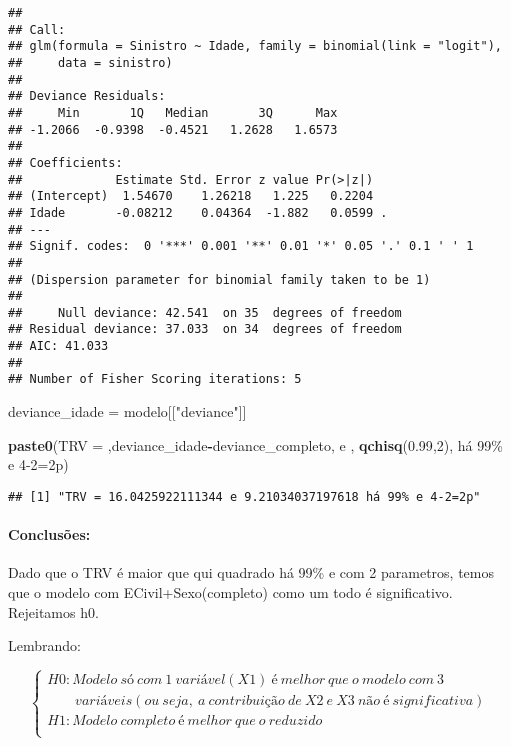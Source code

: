 \documentclass[
]{article}
\newenvironment{Shaded}{\begin{snugshade}}{\end{snugshade}}
\newcommand{\DecValTok}[1]{\textcolor[rgb]{0.00,0.00,0.81}{#1}}
\newcommand{\FloatTok}[1]{\textcolor[rgb]{0.00,0.00,0.81}{#1}}
\newcommand{\FunctionTok}[1]{\textcolor[rgb]{0.13,0.29,0.53}{\textbf{#1}}}
\newcommand{\NormalTok}[1]{#1}
\newcommand{\OtherTok}[1]{\textcolor[rgb]{0.56,0.35,0.01}{#1}}
\newcommand{\SpecialCharTok}[1]{\textcolor[rgb]{0.81,0.36,0.00}{\textbf{#1}}}
\newcommand{\StringTok}[1]{\textcolor[rgb]{0.31,0.60,0.02}{#1}}
\begin{document}
\begin{verbatim}
## 
## Call:
## glm(formula = Sinistro ~ Idade, family = binomial(link = "logit"), 
##     data = sinistro)
## 
## Deviance Residuals: 
##     Min       1Q   Median       3Q      Max  
## -1.2066  -0.9398  -0.4521   1.2628   1.6573  
## 
## Coefficients:
##             Estimate Std. Error z value Pr(>|z|)  
## (Intercept)  1.54670    1.26218   1.225   0.2204  
## Idade       -0.08212    0.04364  -1.882   0.0599 .
## ---
## Signif. codes:  0 '***' 0.001 '**' 0.01 '*' 0.05 '.' 0.1 ' ' 1
## 
## (Dispersion parameter for binomial family taken to be 1)
## 
##     Null deviance: 42.541  on 35  degrees of freedom
## Residual deviance: 37.033  on 34  degrees of freedom
## AIC: 41.033
## 
## Number of Fisher Scoring iterations: 5
\end{verbatim}

\begin{Shaded}
\begin{Highlighting}[]
\NormalTok{deviance\_idade }\OtherTok{=}\NormalTok{ modelo[[}\StringTok{"deviance"}\NormalTok{]]}

\FunctionTok{paste0}\NormalTok{(}\StringTok{\textquotesingle{}TRV = \textquotesingle{}}\NormalTok{,deviance\_idade}\SpecialCharTok{{-}}\NormalTok{deviance\_completo,}\StringTok{\textquotesingle{} e \textquotesingle{}}\NormalTok{, }
       \FunctionTok{qchisq}\NormalTok{(}\FloatTok{0.99}\NormalTok{,}\DecValTok{2}\NormalTok{), }\StringTok{\textquotesingle{} há 99\% e 4{-}2=2p\textquotesingle{}}\NormalTok{)}
\end{Highlighting}
\end{Shaded}

\begin{verbatim}
## [1] "TRV = 16.0425922111344 e 9.21034037197618 há 99% e 4-2=2p"
\end{verbatim}

\hypertarget{conclusuxf5es-18}{%
\paragraph{Conclusões:}\label{conclusuxf5es-18}}

Dado que o TRV é maior que qui quadrado há 99\% e com 2 parametros,
temos que o modelo com ECivil+Sexo(completo) como um todo é
significativo. Rejeitamos h0.

Lembrando:

\[
\left\{ \begin{array}{lc} 
H0:  Modelo \ só \ com \ 1 \ variável (X1) \ é \ melhor \ que \ o \ modelo \ com \ 3 \\
\ \ \ \ \ \ \ \ \ variáveis(ou \ seja, \ a \ contribuição \ de \ X2 \ e \ X3 \ não \ é \ significativa) \\ 
H1:  Modelo \ completo \ é \ melhor \ que \ o \ reduzido \\ 
\end{array}\right.
\]
\end{document}
